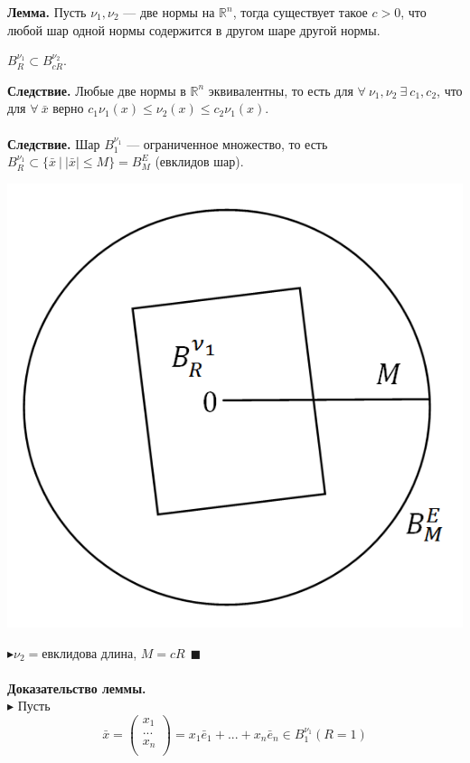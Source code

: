 \documentclass[a4paper,12pt]{article}
\begin{document}
\begin{defintion}
\textbf{Лемма.}
Пусть $\nu_1, \nu_2$ --- две нормы на $\mathbb{R}^n$, тогда существует такое $c>0$, что любой шар одной нормы содержится в другом шаре другой нормы.\begin{center}
	$B_R^{\nu_1} \subset B_{cR}^{\nu_2}$.\end{center}
\textbf{Следствие.}
Любые две нормы в $\mathbb{R}^n$ эквивалентны, то есть для $\forall~ \nu_1, \nu_2 ~\exists~ c_1, c_2$, что для $\forall ~\bar x$ верно $c_1\nu_1(x) \leqslant \nu_2(x) \leqslant c_2\nu_1(x)$.\\
\\
\textbf{Следствие.}
Шар $B_1^{\nu_1}$ --- ограниченное множество, то есть $B_R^{\nu_1} \subset \{ \bar x ~|~ |\bar x| \leqslant M \} = B_M^E$ (евклидов шар).\begin{center}
	\includegraphics[scale=0.5]{l5_4.png}\end{center}
$\blacktriangleright \nu_2 = $евклидова длина, $M=cR ~~ \blacksquare$\\
\\
\textbf{Доказательство леммы.}\\
$\blacktriangleright$ 
Пусть \[\bar x = \begin{pmatrix}
x_1 \\
...\\
x_n \\
\end{pmatrix} = x_1 \bar e_1 +...+x_n \bar e_n \in B_1^{\nu_1} (R = 1)\]

\end{defintion}
\end{document}
